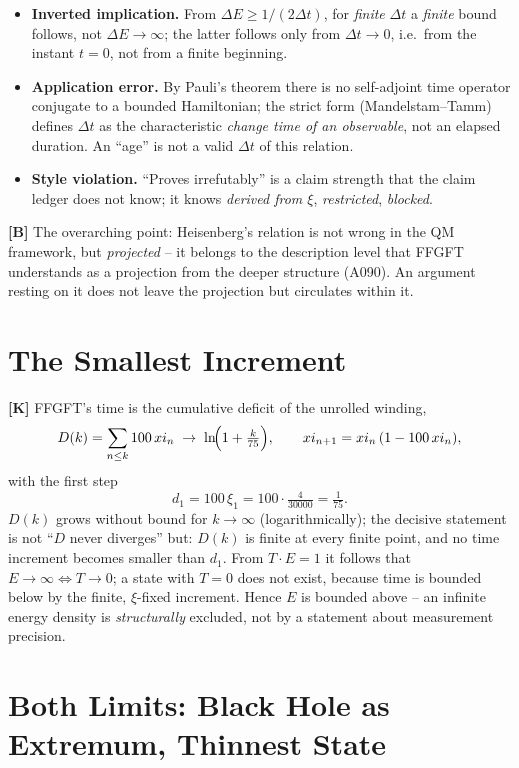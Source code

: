 \begin{itemize}[leftmargin=2em,itemsep=3pt,topsep=3pt]
  \item \textbf{Inverted implication.} From $\Delta E\ge 1/(2\Delta t)$, for
    \emph{finite} $\Delta t$ a \emph{finite} bound follows, not
    $\Delta E\to\infty$; the latter follows only from $\Delta t\to0$, i.e.\ from
    the instant $t=0$, not from a finite beginning.
  \item \textbf{Application error.} By Pauli's theorem there is no self-adjoint
    time operator conjugate to a bounded Hamiltonian; the strict form
    (Mandelstam--Tamm) defines $\Delta t$ as the characteristic \emph{change time
    of an observable}, not an elapsed duration. An ``age'' is not a valid
    $\Delta t$ of this relation.
  \item \textbf{Style violation.} ``Proves irrefutably'' is a claim strength that
    the claim ledger does not know; it knows \emph{derived from $\xi$},
    \emph{restricted}, \emph{blocked}.
\end{itemize}

\textbf{[B]} The overarching point: Heisenberg's relation is not wrong in the
QM framework, but \emph{projected} -- it belongs to the description level that
FFGFT understands as a projection from the deeper structure (A090). An argument
resting on it does not leave the projection but circulates within it.

\section{The Smallest Increment}

\textbf{[K]} FFGFT's time is the cumulative deficit of the unrolled winding,
\[
  D(k) = \sum_{n\le k} 100\,\xi_n \;\to\; \ln\!\Bigl(1+\tfrac{k}{75}\Bigr),
  \qquad \xi_{n+1} = \xi_n\,(1-100\,\xi_n),
\]
with the first step
\[
  d_1 = 100\,\xi_1 = 100\cdot\tfrac{4}{30000} = \tfrac{1}{75}.
\]
$D(k)$ grows without bound for $k\to\infty$ (logarithmically); the decisive
statement is not ``$D$ never diverges'' but: $D(k)$ is finite at every finite
point, and no time increment becomes smaller than $d_1$. From $T\cdot E=1$ it
follows that $E\to\infty\Leftrightarrow T\to0$; a state with $T=0$ does not
exist, because time is bounded below by the finite, $\xi$-fixed increment. Hence
$E$ is bounded above -- an infinite energy density is \emph{structurally}
excluded, not by a statement about measurement precision.

\section{Both Limits: Black Hole as Extremum, Thinnest State}

